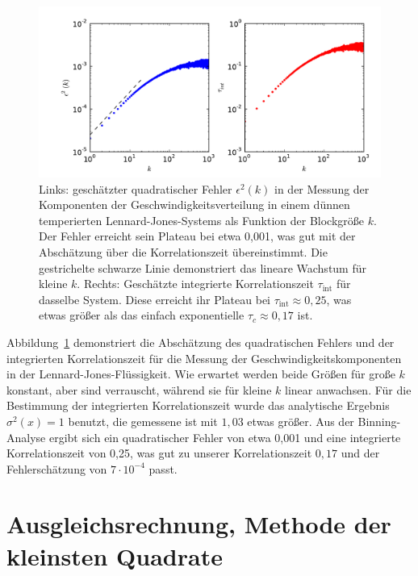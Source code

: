 \begin{figure}
  \centering
  \includegraphics[width=\textwidth]{plots/binning}
  \caption{Links: geschätzter quadratischer Fehler $\epsilon^2(k)$ in
    der Messung der Komponenten der Geschwindigkeitsverteilung in
    einem dünnen temperierten Lennard-Jones-Systems als Funktion der
    Blockgröße $k$. Der Fehler erreicht sein Plateau bei etwa
    0,001, was gut mit der Abschätzung über die Korrelationszeit
    übereinstimmt.  Die gestrichelte schwarze Linie demonstriert das
    lineare Wachstum für kleine $k$. Rechts: Geschätzte integrierte
    Korrelationszeit $\tau_\text{int}$ für dasselbe System.  Diese
    erreicht ihr Plateau bei $\tau_\text{int} \approx 0,25$, was etwas
    größer als das einfach exponentielle $\tau_c\approx 0,17$ ist.}
  \label{fig:binning}
\end{figure}

Abbildung~\ref{fig:binning} demonstriert die Abschätzung des
quadratischen Fehlers und der integrierten Korrelationszeit für
die Messung der Geschwindigkeitskomponenten in der
Lennard-Jones-Flüssigkeit. Wie erwartet werden beide Größen für große
$k$ konstant, aber sind verrauscht, während sie für kleine $k$ linear
anwachsen.  Für die Bestimmung der integrierten Korrelationszeit
wurde das analytische Ergebnis $\sigma^2(x)=1$ benutzt, die gemessene
ist mit $1,03$ etwas größer. Aus der Binning-Analyse ergibt sich ein
quadratischer Fehler von etwa 0,001 und eine integrierte
Korrelationszeit von 0,25, was gut zu unserer Korrelationszeit
$0,17$ und der Fehlerschätzung von $7\cdot 10^{-4}$ passt.

\section{Ausgleichsrechnung, Methode der kleinsten Quadrate}

